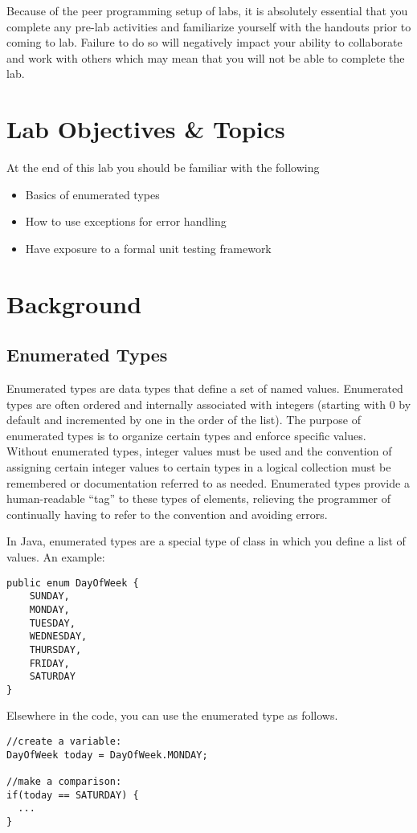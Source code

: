 \documentclass[12pt]{scrartcl}
\begin{document}
Because of the peer programming setup of labs, it is absolutely 
essential that you complete any pre-lab activities and familiarize
yourself with the handouts prior to coming to lab.  Failure to do
so will negatively impact your ability to collaborate and work with 
others which may mean that you will not be able to complete the
lab.  

\section{Lab Objectives \& Topics}
At the end of this lab you should be familiar with the following
\begin{itemize}
  \item Basics of enumerated types
  \item How to use exceptions for error handling
  \item Have exposure to a formal unit testing framework 
\end{itemize}

\section{Background}

\subsection*{Enumerated Types}

Enumerated types are data types that define a set of named values.  
Enumerated types are often ordered and internally associated with 
integers (starting with 0 by default and incremented by one in the 
order of the list).  The purpose of enumerated types is to organize 
certain types and enforce specific values.  Without enumerated types, 
integer values must be used and the convention of assigning certain 
integer values to certain types in a logical collection must be remembered 
or documentation referred to as needed.  Enumerated types provide 
a human-readable ``tag'' to these types of elements, relieving the 
programmer of continually having to refer to the convention and avoiding 
errors.

In Java, enumerated types are a special type of class in which you
define a list of values. An example:

\begin{verbatim}
public enum DayOfWeek {
	SUNDAY,
	MONDAY,
	TUESDAY, 
	WEDNESDAY,
	THURSDAY,
	FRIDAY,
	SATURDAY
}
\end{verbatim}
Elsewhere in the code, you can use the enumerated type as follows.
\begin{verbatim}
//create a variable:
DayOfWeek today = DayOfWeek.MONDAY;

//make a comparison:
if(today == SATURDAY) {
  ...
}
\end{verbatim}
\end{document}
